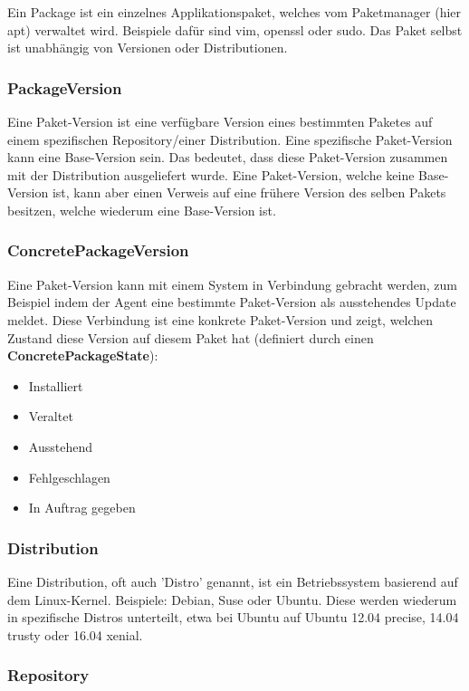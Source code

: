 Ein Package ist ein einzelnes Applikationspaket, welches vom Paketmanager (hier apt) verwaltet wird. Beispiele dafür sind vim, openssl oder sudo. Das Paket selbst ist unabhängig von Versionen oder Distributionen.

\subsubsection{PackageVersion}

Eine Paket-Version ist eine verfügbare Version eines bestimmten Paketes auf einem spezifischen Repository/einer Distribution. Eine spezifische Paket-Version kann eine Base-Version sein. Das bedeutet, dass diese Paket-Version zusammen mit der Distribution ausgeliefert wurde. Eine Paket-Version, welche keine Base-Version ist, kann aber einen Verweis auf eine frühere Version des selben Pakets besitzen, welche wiederum eine Base-Version ist.

\subsubsection{ConcretePackageVersion}

Eine Paket-Version kann mit einem System in Verbindung gebracht werden, zum Beispiel indem der Agent eine bestimmte Paket-Version als ausstehendes Update meldet. Diese Verbindung ist eine konkrete Paket-Version und zeigt, welchen Zustand diese Version auf diesem Paket hat (definiert durch einen \textbf{ConcretePackageState}):

\begin{itemize}
    \item Installiert
    \item Veraltet
    \item Ausstehend
    \item Fehlgeschlagen
    \item In Auftrag gegeben
\end{itemize}


\subsubsection{Distribution}

Eine Distribution, oft auch 'Distro' genannt, ist ein Betriebssystem basierend auf dem Linux-Kernel. Beispiele: Debian, Suse oder Ubuntu. Diese werden wiederum in spezifische Distros unterteilt, etwa bei Ubuntu auf Ubuntu 12.04 precise, 14.04 trusty oder 16.04 xenial.

\subsubsection{Repository}

